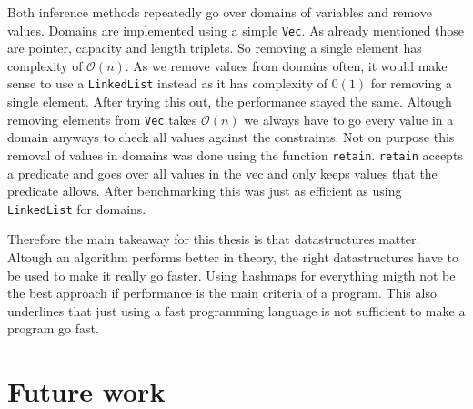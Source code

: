 Both inference methods repeatedly go over domains of variables and remove values. Domains are implemented using a simple \verb|Vec|. As already mentioned those are pointer, capacity and length triplets. So removing a single element has complexity of $\mathcal{O}(n)$. As we remove values from domains often, it would make sense to use a \verb|LinkedList| instead as it has complexity of $\mathcal{0}(1)$ for removing a single element. After trying this out, the performance stayed the same. Altough removing elements from \verb|Vec| takes $\mathcal{O}(n)$ we always have to go every value in a domain anyways to check all values against the constraints. Not on purpose this removal of values in domains was done using the function \verb|retain|. \verb|retain| accepts a predicate and goes over all values in the vec and only keeps values that the predicate allows. After benchmarking this was just as efficient as using \verb|LinkedList| for domains.

Therefore the main takeaway for this thesis is that datastructures matter. Altough an algorithm performs better in theory, the right datastructures have to be used to make it really go faster. Using hashmaps for everything migth not be the best approach if performance is the main criteria of a program. This also underlines that just using a fast programming language is not sufficient to make a program go fast.

\section{Future work}

